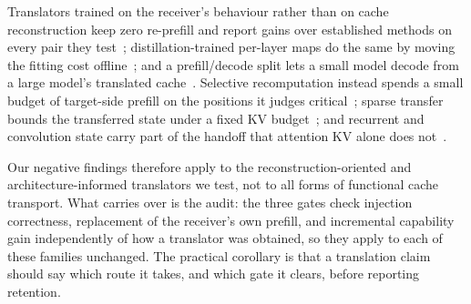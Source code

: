 \documentclass{article} %
\newcommand{\kv}{\ensuremath{\mathrm{KV}}}
\begin{document}
Translators trained on the receiver's behaviour rather than on cache
reconstruction keep zero re-prefill and report gains over established methods on
every pair they test~\citep{cachelink2026}; distillation-trained per-layer maps
do the same by moving the fitting cost offline~\citep{kvlingo2026}; and a
prefill/decode split lets a small model decode from a large model's translated
cache~\citep{bridgekv2026}. Selective recomputation instead spends a small
budget of target-side prefill on the positions it judges
critical~\citep{raracache2026}; sparse transfer bounds the transferred state
under a fixed \kv{} budget~\citep{acct2026}; and recurrent and convolution state
carry part of the handoff that attention \kv{} alone does
not~\citep{latentport2026}.

Our negative findings therefore apply to the reconstruction-oriented and
architecture-informed translators we test, not to all forms of functional cache
transport. What carries over is the audit: the three gates check injection
correctness, replacement of the receiver's own prefill, and incremental
capability gain independently of how a translator was obtained, so they apply to
each of these families unchanged. The practical corollary is that a translation
claim should say which route it takes, and which gate it clears, before
reporting retention.
\end{document}
